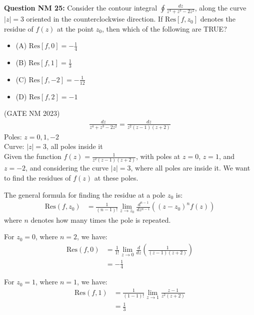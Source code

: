 \documentclass[journal,12pt,twocolumn]{IEEEtran}
\theoremstyle{remark}
\begin{document}
\title{}
\author{Sasa Mardi, EE23BTECH11222}
\date{}
\maketitle

\textbf{Question NM 25:} Consider the contour integral $\oint \frac{dz}{z^4 + z^3 - 2z^2}$, along the curve $|z| = 3$ oriented in the counterclockwise direction. If $\text{Res}[f, z_0]$ denotes the residue of $f(z)$ at the point $z_0$, then which of the following are TRUE? \\
\begin{itemize}
    \item (A) $\text{Res}[f, 0] = -\frac{1}{4}$
    \item (B) $\text{Res}[f, 1] = \frac{1}{3}$
    \item (C) $\text{Res}[f, -2] = -\frac{1}{12}$
    \item (D) $\text{Res}[f, 2] = -1$
\end{itemize}
\hfill{(GATE NM 2023)}\\
\solution
\begin{align}
\frac{dz}{z^4 + z^3 - 2z^2} = \frac{dz}{z^2(z-1)(z+2)}
\end{align}
Poles: $z = 0, 1, -2$ \\
Curve: $|z| = 3$, all poles inside it \\
Given the function $f(z) = \frac{1}{z^2(z-1)(z+2)}$, with poles at $z = 0$, $z = 1$, and $z = -2$, and considering the curve $|z| = 3$, where all poles are inside it. We want to find the residues of $f(z)$ at these poles.

The general formula for finding the residue at a pole $z_0$ is:
\begin{align}
\text{Res}(f, z_0) &= \frac{1}{(n-1)!} \lim_{z \to z_0} \frac{d^{n-1}}{dz^{n-1}} \left( (z - z_0)^n f(z) \right)
\end{align}
where $n$ denotes how many times the pole is repeated.

For $z_0 = 0$, where $n = 2$, we have:
\begin{align}
\text{Res}(f, 0) &= \frac{1}{1!} \lim_{z \to 0} \frac{d}{dz} \left( \frac{1}{(z-1)(z+2)} \right) \\
&= -\frac{1}{4}
\end{align}

For $z_0 = 1$, where $n = 1$, we have:
\begin{align}
\text{Res}(f, 1) &= \frac{1}{(1-1)!} \lim_{z \to 1} \frac{z-1}{z^2(z+2)} \\
&= \frac{1}{3}
\end{align}
\end{document}
